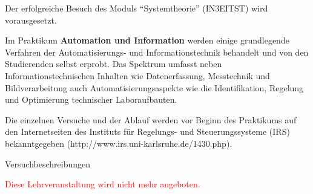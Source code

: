 \begin{course}

\setdoclanguagegerman
{}



\coursehead


\label{cour_8059.dp_997}


\begin{styleenv}
\begin{assessment}

\end{assessment}

\begin{conditions}Der erfolgreiche Besuch des Moduls “Systemtheorie” (IN3EITST) wird vorausgesetzt.

\end{conditions}


\end{styleenv}

\begin{learningoutcomes}
Im Praktikum \textbf{Automation und Information} werden einige grundlegende Verfahren der Automatisierungs- und Informationstechnik behandelt und von den Studierenden selbst erprobt. Das Spektrum umfasst neben Informationstechnischen Inhalten wie Datenerfassung, Messtechnik und Bildverarbeitung auch Automatisierungsaspekte wie die Identifikation, Regelung und Optimierung technischer Laboraufbauten.


\end{learningoutcomes}

\begin{content}
Die einzelnen Versuche und der Ablauf werden vor Beginn des Praktikums auf den Internetseiten des Instituts für Regelungs- und Steuerungssysteme (IRS) bekanntgegeben (http://www.irs.uni-karlsruhe.de/1430.php).


\end{content}

\begin{media}Versuchbeschreibungen

\end{media}



\begin{remarks}\textcolor{red}{Diese Lehrveranstaltung wird nicht mehr angeboten.}

\end{remarks}

\end{course}